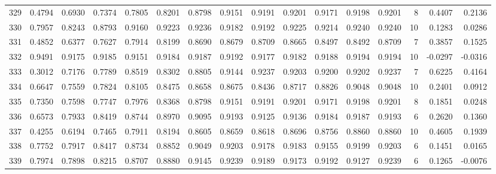 \begin{tabular}{lrrrrrrrrrrrrrrr}
329 &      0.4794 &  0.6930 &  0.7374 &  0.7805 &  0.8201 &  0.8798 &  0.9151 &  0.9191 &  0.9201 &  0.9171 &   0.9198 &     0.9201 &      8 &                    0.4407 &                     0.2136 \\
330 &      0.7957 &  0.8243 &  0.8793 &  0.9160 &  0.9223 &  0.9236 &  0.9182 &  0.9192 &  0.9225 &  0.9214 &   0.9240 &     0.9240 &     10 &                    0.1283 &                     0.0286 \\
331 &      0.4852 &  0.6377 &  0.7627 &  0.7914 &  0.8199 &  0.8690 &  0.8679 &  0.8709 &  0.8665 &  0.8497 &   0.8492 &     0.8709 &      7 &                    0.3857 &                     0.1525 \\
332 &      0.9491 &  0.9175 &  0.9185 &  0.9151 &  0.9184 &  0.9187 &  0.9192 &  0.9177 &  0.9182 &  0.9188 &   0.9194 &     0.9194 &     10 &                   -0.0297 &                    -0.0316 \\
333 &      0.3012 &  0.7176 &  0.7789 &  0.8519 &  0.8302 &  0.8805 &  0.9144 &  0.9237 &  0.9203 &  0.9200 &   0.9202 &     0.9237 &      7 &                    0.6225 &                     0.4164 \\
334 &      0.6647 &  0.7559 &  0.7824 &  0.8105 &  0.8475 &  0.8658 &  0.8675 &  0.8436 &  0.8717 &  0.8826 &   0.9048 &     0.9048 &     10 &                    0.2401 &                     0.0912 \\
335 &      0.7350 &  0.7598 &  0.7747 &  0.7976 &  0.8368 &  0.8798 &  0.9151 &  0.9191 &  0.9201 &  0.9171 &   0.9198 &     0.9201 &      8 &                    0.1851 &                     0.0248 \\
336 &      0.6573 &  0.7933 &  0.8419 &  0.8744 &  0.8970 &  0.9095 &  0.9193 &  0.9125 &  0.9136 &  0.9184 &   0.9187 &     0.9193 &      6 &                    0.2620 &                     0.1360 \\
337 &      0.4255 &  0.6194 &  0.7465 &  0.7911 &  0.8194 &  0.8605 &  0.8659 &  0.8618 &  0.8696 &  0.8756 &   0.8860 &     0.8860 &     10 &                    0.4605 &                     0.1939 \\
338 &      0.7752 &  0.7917 &  0.8417 &  0.8734 &  0.8852 &  0.9049 &  0.9203 &  0.9178 &  0.9183 &  0.9155 &   0.9199 &     0.9203 &      6 &                    0.1451 &                     0.0165 \\
339 &      0.7974 &  0.7898 &  0.8215 &  0.8707 &  0.8880 &  0.9145 &  0.9239 &  0.9189 &  0.9173 &  0.9192 &   0.9127 &     0.9239 &      6 &                    0.1265 &                    -0.0076 \\

\end{tabular}
